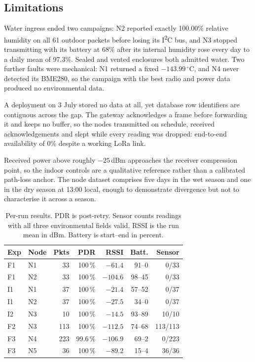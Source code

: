 \documentclass[conference]{IEEEtran}
\newcommand{\ch}[1]{\textcolor{DiffOrange}{#1}}
\newenvironment{changed}{}{}
\newcommand{\ch}[1]{#1}
\begin{document}
\subsection{Limitations}
\label{sec:limitations}
\begin{changed}
Water ingress ended two campaigns: N2 reported exactly 100.00\% relative humidity on all 61 outdoor packets before losing its I\textsuperscript{2}C bus, and N3 stopped transmitting with its battery at 68\% after its internal humidity rose every day to a daily mean of 97.3\%. Sealed and vented enclosures both admitted water. Two further faults were mechanical: N1 returned a fixed $-143.99$\,$^\circ$C, and N4 never detected its BME280, so the campaign with the best radio and power data produced no environmental data.

A deployment on 3 July stored no data at all, yet database row identifiers are contiguous across the gap. The gateway acknowledges a frame before forwarding it and keeps no buffer, so the nodes transmitted on schedule, received acknowledgements and slept while every reading was dropped: end-to-end availability of 0\% despite a working LoRa link.

Received power above roughly $-25$\,dBm approaches the receiver compression point, so the indoor controls are a qualitative reference rather than a calibrated path-loss anchor. The node dataset comprises five days in the wet season and one in the dry season at 13:00 local, enough to demonstrate divergence but not to characterise it across a season.
\end{changed}

\begin{table}[!t]
\centering
\caption{\ch{Per-run results. PDR is post-retry. Sensor counts readings with all three environmental fields valid. RSSI is the run mean in dBm. Battery is start--end in percent.}}
\label{tab:runs}
\footnotesize
\setlength{\tabcolsep}{4pt}
\begin{tabular}{llrrrrr}
\hline
\textbf{Exp} & \textbf{Node} & \textbf{Pkts} & \textbf{PDR} & \textbf{RSSI} & \textbf{Batt.} & \textbf{Sensor} \\
\hline
F1 & N1 & 33  & 100\,\%  & $-61.4$  & 91--0   & 0/33 \\
F1 & N2 & 33  & 100\,\%  & $-104.6$ & 98--45  & 0/33 \\
I1 & N1 & 37  & 100\,\%  & $-21.4$  & 57--52  & 0/37 \\
I1 & N2 & 37  & 100\,\%  & $-27.5$  & 34--0   & 0/37 \\
I2 & N3 & 10  & 100\,\%  & $-14.5$  & 93--89  & 10/10 \\
F2 & N3 & 113 & 100\,\%  & $-112.5$ & 74--68  & 113/113 \\
F3 & N4 & 223 & 99.6\,\% & $-106.9$ & 69--2   & 0/223 \\
F3 & N5 & 36  & 100\,\%  & $-89.2$  & 15--4   & 36/36 \\
\hline
\end{tabular}
\end{table}
\end{document}

